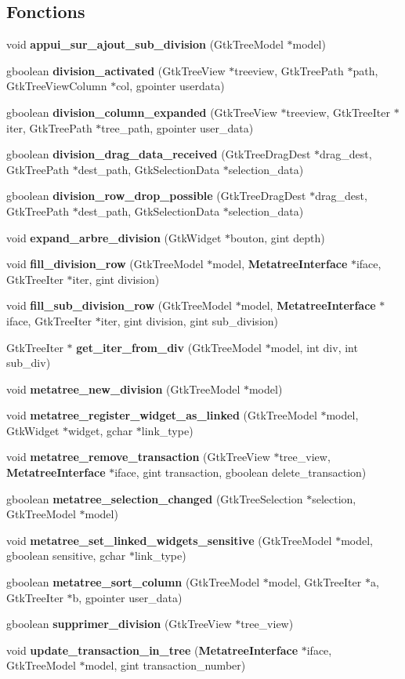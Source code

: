 \subsection*{Fonctions}
\begin{DoxyCompactItemize}
\item 
void {\bf appui\_\-sur\_\-ajout\_\-sub\_\-division} (GtkTreeModel $\ast$model)
\item 
gboolean {\bf division\_\-activated} (GtkTreeView $\ast$treeview, GtkTreePath $\ast$path, GtkTreeViewColumn $\ast$col, gpointer userdata)
\item 
gboolean {\bf division\_\-column\_\-expanded} (GtkTreeView $\ast$treeview, GtkTreeIter $\ast$iter, GtkTreePath $\ast$tree\_\-path, gpointer user\_\-data)
\item 
gboolean {\bf division\_\-drag\_\-data\_\-received} (GtkTreeDragDest $\ast$drag\_\-dest, GtkTreePath $\ast$dest\_\-path, GtkSelectionData $\ast$selection\_\-data)
\item 
gboolean {\bf division\_\-row\_\-drop\_\-possible} (GtkTreeDragDest $\ast$drag\_\-dest, GtkTreePath $\ast$dest\_\-path, GtkSelectionData $\ast$selection\_\-data)
\item 
void {\bf expand\_\-arbre\_\-division} (GtkWidget $\ast$bouton, gint depth)
\item 
void {\bf fill\_\-division\_\-row} (GtkTreeModel $\ast$model, {\bf MetatreeInterface} $\ast$iface, GtkTreeIter $\ast$iter, gint division)
\item 
void {\bf fill\_\-sub\_\-division\_\-row} (GtkTreeModel $\ast$model, {\bf MetatreeInterface} $\ast$iface, GtkTreeIter $\ast$iter, gint division, gint sub\_\-division)
\item 
GtkTreeIter $\ast$ {\bf get\_\-iter\_\-from\_\-div} (GtkTreeModel $\ast$model, int div, int sub\_\-div)
\item 
void {\bf metatree\_\-new\_\-division} (GtkTreeModel $\ast$model)
\item 
void {\bf metatree\_\-register\_\-widget\_\-as\_\-linked} (GtkTreeModel $\ast$model, GtkWidget $\ast$widget, gchar $\ast$link\_\-type)
\item 
void {\bf metatree\_\-remove\_\-transaction} (GtkTreeView $\ast$tree\_\-view, {\bf MetatreeInterface} $\ast$iface, gint transaction, gboolean delete\_\-transaction)
\item 
gboolean {\bf metatree\_\-selection\_\-changed} (GtkTreeSelection $\ast$selection, GtkTreeModel $\ast$model)
\item 
void {\bf metatree\_\-set\_\-linked\_\-widgets\_\-sensitive} (GtkTreeModel $\ast$model, gboolean sensitive, gchar $\ast$link\_\-type)
\item 
gboolean {\bf metatree\_\-sort\_\-column} (GtkTreeModel $\ast$model, GtkTreeIter $\ast$a, GtkTreeIter $\ast$b, gpointer user\_\-data)
\item 
gboolean {\bf supprimer\_\-division} (GtkTreeView $\ast$tree\_\-view)
\item 
void {\bf update\_\-transaction\_\-in\_\-tree} ({\bf MetatreeInterface} $\ast$iface, GtkTreeModel $\ast$model, gint transaction\_\-number)
\end{DoxyCompactItemize}


